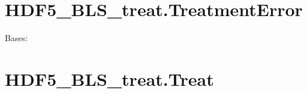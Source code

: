 \documentclass[letterpaper,10pt,english]{sphinxmanual}
\begin{document}
\sphinxstepscope


\section{HDF5\_BLS\_treat.TreatmentError}
\label{\detokenize{source/_autosummary/HDF5_BLS_treat.TreatmentError:hdf5-bls-treat-treatmenterror}}\label{\detokenize{source/_autosummary/HDF5_BLS_treat.TreatmentError::doc}}

\begin{fulllineitems}
\label{\detokenize{source/_autosummary/HDF5_BLS_treat.TreatmentError:HDF5_BLS_treat.TreatmentError}}
\pysigstartsignatures
\pysiglinewithargsret
{}
{}
{}
\pysigstopsignatures
\sphinxAtStartPar
Bases: 

\end{fulllineitems}


\sphinxstepscope


\section{HDF5\_BLS\_treat.Treat}
\label{\detokenize{source/_autosummary/HDF5_BLS_treat.Treat:hdf5-bls-treat-treat}}\label{\detokenize{source/_autosummary/HDF5_BLS_treat.Treat::doc}}
\end{document}
